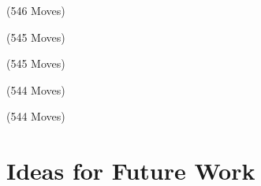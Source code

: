 \documentclass{beamer}
\theoremstyle{definition}
\begin{document}
{    \begin{frame}{\chessTitle (546 Moves)}
      \begin{figure}[H]
        \centering
        \showboard
      \end{figure}
    \end{frame}

    \begin{frame}{\chessTitle (545 Moves)}
      \begin{figure}[H]
        \centering
        \showboard
      \end{figure}
    \end{frame}

    \begin{frame}{\chessTitle (545 Moves)}
      \begin{figure}[H]
        \centering
        \showboard
      \end{figure}
    \end{frame}

    \begin{frame}{\chessTitle (544 Moves)}
      \begin{figure}[H]
        \centering
        \showboard
      \end{figure}
    \end{frame}

    \begin{frame}{\chessTitle (544 Moves)}
      \begin{figure}[H]
        \centering
        \showboard
      \end{figure}
    \end{frame}
  }

  \section{Ideas for Future Work}
\end{document}

